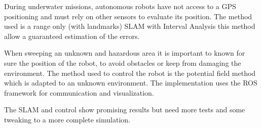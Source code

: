 During underwater missions, autonomous robots have not access to a GPS positioning
and must rely on other sensors to  evaluate its position. The method used is a range only (with landmarks) SLAM
with Interval Analysis this method allow a guaranteed estimation of the errors.

When sweeping an unknown and hazardous area it is important to known for sure the position of the robot, to avoid obstacles or keep from damaging the environment. The method used to control the robot is the potential field
method which is adapted to an unknown environment. The implementation uses the ROS framework for communication and visualization.
 
The SLAM and control show promising results but need more tests and some tweaking to a more complete simulation.